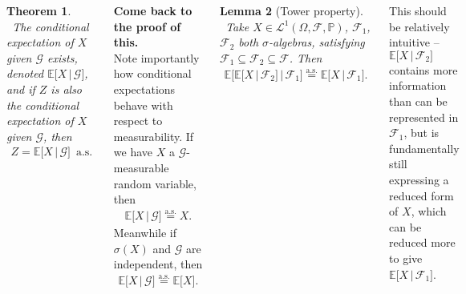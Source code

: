 \documentclass{tikzposter} %
\newtheorem{theorem}{Theorem}
\newtheorem{lemma}[theorem]{Lemma}
\begin{document}
\begin{columns}
{    \begin{theorem}
    \ The conditional expectation of $X$ given $\mathcal{G}$ exists, denoted $\mathbb{E}\big[X \,|\, \mathcal{G}\big]$, and if $Z$ is also the conditional expectation of $X$ given $\mathcal{G}$, then
    \begin{align*}
      Z = \mathbb{E}\big[X \,|\, \mathcal{G}\big] \,\,\, \text{a.s.}
    \end{align*}
    \end{theorem}

    \textbf{Come back to the proof of this.} \\

    Note importantly how conditional expectations behave with respect to measurability. If we have $X$ a $\mathcal{G}$-measurable random variable, then
    \begin{align*}
      \mathbb{E}\big[X \,|\, \mathcal{G}\big] \overset{\mathrm{a.s.}}{=} X.
    \end{align*}
    Meanwhile if $\sigma(X)$ and $\mathcal{G}$ are independent, then
    \begin{align*}
      \mathbb{E}\big[X \,|\, \mathcal{G}\big] \overset{\mathrm{a.s.}}{=} \mathbb{E}\big[X\big].
    \end{align*}
    \hphantom{}

    \begin{lemma}[Tower property]
      \ Take $X \in \mathcal{L}^{1}(\Omega, \mathcal{F}, \mathbb{P})$, $\mathcal{F}_{1}$, $\mathcal{F}_{2}$ both $\sigma$-algebras, satisfying $\mathcal{F}_{1} \subseteq \mathcal{F}_{2} \subseteq \mathcal{F}$. Then
      \begin{align*}
        \mathbb{E}\Big[\mathbb{E}\big[X \,|\, \mathcal{F}_{2}\big] \,|\, \mathcal{F}_{1}\Big] \overset{\mathrm{a.s.}}{=} \mathbb{E}\big[X \,|\, \mathcal{F}_{1}\big].
      \end{align*}
    \end{lemma}

    This should be relatively intuitive -- $\mathbb{E}\big[X \,|\, \mathcal{F}_{2}\big]$ contains more information than can be represented in $\mathcal{F}_{1}$, but is fundamentally still expressing a reduced form of $X$, which can be reduced more to give $\mathbb{E}\big[X \,|\, \mathcal{F}_{1}\big]$. \\

}
\end{columns}
\end{document}
